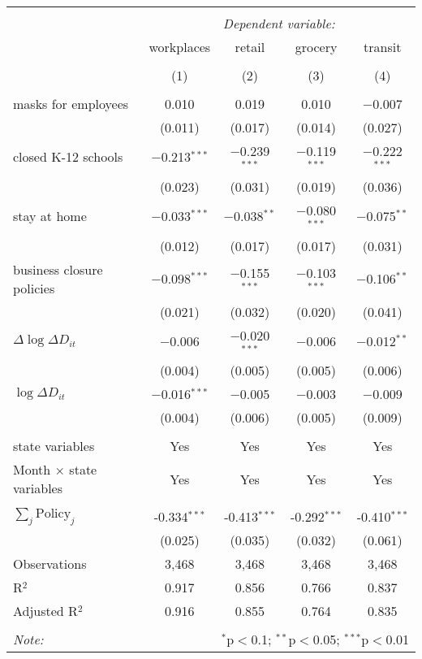 \begin{tabular}{@{\extracolsep{1pt}}lcccc} 
\\[-1.8ex]\hline 
\hline \\[-1.8ex] 
 & \multicolumn{4}{c}{\textit{Dependent variable:}} \\ 
\cline{2-5} 
 & workplaces & retail & grocery & transit \\ 
\\[-1.8ex] & (1) & (2) & (3) & (4)\\ 
\hline \\[-1.8ex] 
 masks for employees & 0.010 & 0.019 & 0.010 & $-$0.007 \\ 
  & (0.011) & (0.017) & (0.014) & (0.027) \\ 
  closed K-12 schools & $-$0.213$^{***}$ & $-$0.239$^{***}$ & $-$0.119$^{***}$ & $-$0.222$^{***}$ \\ 
  & (0.023) & (0.031) & (0.019) & (0.036) \\ 
  stay at home & $-$0.033$^{***}$ & $-$0.038$^{**}$ & $-$0.080$^{***}$ & $-$0.075$^{**}$ \\ 
  & (0.012) & (0.017) & (0.017) & (0.031) \\ 
  business closure policies & $-$0.098$^{***}$ & $-$0.155$^{***}$ & $-$0.103$^{***}$ & $-$0.106$^{**}$ \\ 
  & (0.021) & (0.032) & (0.020) & (0.041) \\ 
  $\Delta \log \Delta D_{it}$ & $-$0.006 & $-$0.020$^{***}$ & $-$0.006 & $-$0.012$^{**}$ \\ 
  & (0.004) & (0.005) & (0.005) & (0.006) \\ 
  $\log \Delta D_{it}$ & $-$0.016$^{***}$ & $-$0.005 & $-$0.003 & $-$0.009 \\ 
  & (0.004) & (0.006) & (0.005) & (0.009) \\ 
 \hline \\[-1.8ex] 
state variables & Yes & Yes & Yes & Yes \\ 
Month $\times$ state variables & Yes & Yes & Yes & Yes \\ 
\hline \\[-1.8ex] 
$\sum_j \mathrm{Policy}_j$ & -0.334$^{***}$ & -0.413$^{***}$ & -0.292$^{***}$ & -0.410$^{***}$ \\ 
 & (0.025) & (0.035) & (0.032) & (0.061) \\ 
Observations & 3,468 & 3,468 & 3,468 & 3,468 \\ 
R$^{2}$ & 0.917 & 0.856 & 0.766 & 0.837 \\ 
Adjusted R$^{2}$ & 0.916 & 0.855 & 0.764 & 0.835 \\ 
\hline 
\hline \\[-1.8ex] 
\textit{Note:}  & \multicolumn{4}{r}{$^{*}$p$<$0.1; $^{**}$p$<$0.05; $^{***}$p$<$0.01} \\ 
\end{tabular} 